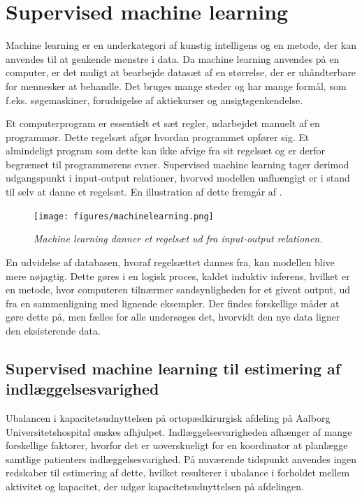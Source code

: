 \section{Supervised machine learning}
Machine learning er en underkategori af kunstig intelligens og en metode, der kan anvendes til at genkende mønstre i data. Da machine learning anvendes på en computer, er det muligt at bearbejde datasæt af en størrelse, der er uhåndterbare for mennesker at behandle. Det bruges mange steder og har mange formål, som f.eks. søgemaskiner, forudsigelse af aktiekurser og ansigtsgenkendelse.\cite{DIKU2010}


Et computerprogram er essentielt et sæt regler, udarbejdet manuelt af en programmør. Dette regelsæt afgør hvordan programmet opfører sig. Et almindeligt program som dette kan ikke afvige fra sit regelsæt og er derfor begrænset til programmørens evner.
Supervised machine learning tager derimod udgangspunkt i input-output relationer, hvorved modellen uafhængigt er i stand til selv at danne et regelsæt. En illustration af dette fremgår af .


\begin{figure}[H]
	\centering
	\texttt{[image: figures/machinelearning.png]}
	\caption{\textit{Machine learning danner et regelsæt ud fra input-output relationen.}\cite{DIKU2010}}
	\label{ml}
	\end{figure}


En udvidelse af databasen, hvoraf regelsættet dannes fra, kan modellen blive mere nøjagtig. Dette gøres i en logisk proces, kaldet induktiv inferens, hvilket er en metode, hvor computeren tilnærmer sandsynligheden for et givent output, ud fra en sammenligning med lignende eksempler. Der findes forskellige måder at gøre dette på, men fælles for alle undersøges det, hvorvidt den nye data ligner den eksisterende data.\cite{DIKU2010}


\subsection{Supervised machine learning til estimering af indlæggelsesvarighed}
Ubalancen i kapacitetsudnyttelsen på ortopædkirurgisk afdeling på Aalborg Universitetshospital ønskes afhjulpet. Indlæggelsesvarigheden afhænger af mange forskellige faktorer, hvorfor det er uoverskueligt for en koordinator at planlægge samtlige patienters indlæggelsesvarighed. På nuværende tidspunkt anvendes ingen redskaber til estimering af dette, hvilket resulterer i ubalance i forholdet mellem aktivitet og kapacitet, der udgør kapacitetsudnyttelsen på afdelingen. 


